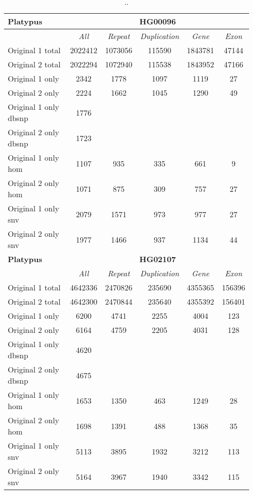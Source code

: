 \clearpage

\begin{table}[htb]
\begin{center}
\begin{tabular}{|l|c||c|c|c|c|}
\hline
{\bf Platypus} & \multicolumn{5}{|c|}{\bf HG00096} \\
\hline
\cline{2-6}
{\bf} & {\it All} & {\it Repeat} & {\it Duplication} & {\it Gene} & {\it Exon} \\
\hline
Original 1 total & 2022412 & 1073056 & 115590 & 1843781 & 47144\\ 
\hline
Original 2 total & 2022294 & 1072940 & 115538 & 1843952 & 47166\\ 
\hline
Original 1 only & 2342 & 1778 & 1097 & 1119 & 27\\ 
\hline
Original 2 only & 2224 & 1662 & 1045 & 1290 & 49\\ 
\hline
Original 1 only dbsnp & 1776 &  &  &  & \\ 
\hline
Original 2 only dbsnp & 1723 &  &  &  & \\ 
\hline
Original 1 only hom & 1107 & 935 & 335 & 661 & 9\\ 
\hline
Original 2 only hom & 1071 & 875 & 309 & 757 & 27\\ 
\hline
Original 1 only snv & 2079 & 1571 & 973 & 977 & 27\\ 
\hline
Original 2 only snv & 1977 & 1466 & 937 & 1134 & 44\\ 
\hline
\hline
{\bf Platypus} & \multicolumn{5}{|c|}{\bf HG02107} \\
\hline
\cline{2-6}
{\bf} & {\it All} & {\it Repeat} & {\it Duplication} & {\it Gene} & {\it Exon} \\
\hline
Original 1 total & 4642336 & 2470826 & 235690 & 4355365 & 156396\\ 
\hline
Original 2 total & 4642300 & 2470844 & 235640 & 4355392 & 156401\\ 
\hline
Original 1 only & 6200 & 4741 & 2255 & 4004 & 123\\ 
\hline
Original 2 only & 6164 & 4759 & 2205 & 4031 & 128\\ 
\hline
Original 1 only dbsnp & 4620 &  &  &  & \\ 
\hline
Original 2 only dbsnp & 4675 &  &  &  & \\ 
\hline
Original 1 only hom & 1653 & 1350 & 463 & 1249 & 28\\ 
\hline
Original 2 only hom & 1698 & 1391 & 488 & 1368 & 35\\ 
\hline
Original 1 only snv & 5113 & 3895 & 1932 & 3212 & 113\\ 
\hline
Original 2 only snv & 5164 & 3967 & 1940 & 3342 & 115\\ 
\hline
\end{tabular}
\end{center}
\caption{ .. }
\label{tab:orig-vs-shuf-platypus}
\end{table}

